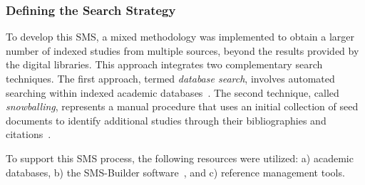 \subsubsection{Defining the Search Strategy}\label{subsubsec:estrategia-busqueda}

To develop this SMS, a mixed  methodology was implemented to obtain a larger number of indexed studies from multiple sources, beyond the results provided by the digital libraries. This approach integrates two complementary search techniques. The first approach, termed \textit{database search}, involves automated searching within indexed academic databases~\cite{Jalai-01}. The second technique, called \textit{snowballing}, represents a manual procedure that uses an initial collection of seed documents to identify additional studies through their bibliographies and citations~\cite{Jalai-01,Goodman-01}.

To support this SMS process, the following resources were utilized: a) academic databases, b) the SMS-Builder software~\cite{Candela2022100935}, and c) reference management tools.